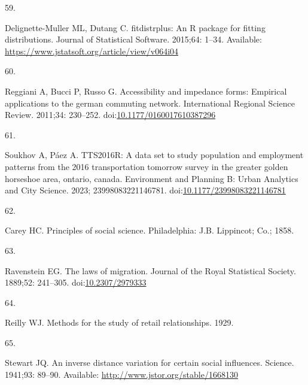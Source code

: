 \documentclass[10pt,letterpaper]{article}
\newlength{\cslhangindent}
\newlength{\csllabelwidth}
\newlength{\cslentryspacingunit} %
\newenvironment{CSLReferences}[2] %
 {%
  \setlength{\parindent}{0pt}
  \ifodd #1
  \let\oldpar\par
  \def\par{\hangindent=\cslhangindent\oldpar}
  \fi
  \setlength{\parskip}{#2\cslentryspacingunit}
 }%
 {}
\newcommand{\CSLLeftMargin}[1]{\parbox[t]{\csllabelwidth}{#1}}
\newcommand{\CSLRightInline}[1]{\parbox[t]{\linewidth - \csllabelwidth}{#1}\break}
\providecommand{\DIFaddbegin}{} %
\providecommand{\DIFaddend}{} %
\providecommand{\DIFdelbegin}{} %
\providecommand{\DIFdelend}{} %
\newcommand{\DIFscaledelfig}{0.5}
\newlength{\DIFdelgraphicswidth} %
\newlength{\DIFdelgraphicsheight} %
\newcommand{\DIFaddincludegraphics}[2][]{{\color{blue}\fbox{\DIFOincludegraphics[#1]{#2}}}} %
\newcommand{\DIFdelincludegraphics}[2][]{%
\sbox{\DIFdelgraphicsbox}{\DIFOincludegraphics[#1]{#2}}%
\settoboxwidth{\DIFdelgraphicswidth}{\DIFdelgraphicsbox} %
\settoboxtotalheight{\DIFdelgraphicsheight}{\DIFdelgraphicsbox} %
\scalebox{\DIFscaledelfig}{%
\parbox[b]{\DIFdelgraphicswidth}{\usebox{\DIFdelgraphicsbox}\\[-\baselineskip] \rule{\DIFdelgraphicswidth}{0em}}\llap{\resizebox{\DIFdelgraphicswidth}{\DIFdelgraphicsheight}{%
\setlength{\unitlength}{\DIFdelgraphicswidth}%
\begin{picture}(1,1)%
\thicklines\linethickness{2pt} %
{\color[rgb]{1,0,0}\put(0,0){\framebox(1,1){}}}%
{\color[rgb]{1,0,0}\put(0,0){\line( 1,1){1}}}%
{\color[rgb]{1,0,0}\put(0,1){\line(1,-1){1}}}%
\end{picture}%
}\hspace*{3pt}}} %
} %
\DeclareRobustCommand{\DIFaddbegin}{\DIFOaddbegin \let\includegraphics\DIFaddincludegraphics} %
\DeclareRobustCommand{\DIFaddend}{\DIFOaddend \let\includegraphics\DIFOincludegraphics} %
\DeclareRobustCommand{\DIFdelbegin}{\DIFOdelbegin \let\includegraphics\DIFdelincludegraphics} %
\DeclareRobustCommand{\DIFdelend}{\DIFOaddend \let\includegraphics\DIFOincludegraphics} %
\begin{document}
\begin{CSLReferences}{0}{0}
\leavevmode{}%
\DIFdelbegin %
\DIFdelend \DIFaddbegin \CSLLeftMargin{59. }\DIFaddend %
\CSLRightInline{Delignette-Muller ML, Dutang C. {fitdistrplus}: An {R}
package for fitting distributions. Journal of Statistical Software.
2015;64: 1--34. Available:
\url{https://www.jstatsoft.org/article/view/v064i04}}

\leavevmode{}%
\DIFdelbegin %
\DIFdelend \DIFaddbegin \CSLLeftMargin{60. }\DIFaddend %
\CSLRightInline{Reggiani A, Bucci P, Russo G. Accessibility and
impedance forms: Empirical applications to the german commuting network.
International Regional Science Review. 2011;34: 230--252.
doi:\href{https://doi.org/10.1177/0160017610387296}{10.1177/0160017610387296}}

\leavevmode{}%
\DIFdelbegin %
\DIFdelend \DIFaddbegin \CSLLeftMargin{61. }\DIFaddend %
\CSLRightInline{Soukhov A, Páez A. {TTS}2016R: A data set to study
population and employment patterns from the 2016 transportation tomorrow
survey in the greater golden horseshoe area, ontario, canada.
Environment and Planning B: Urban Analytics and City Science. 2023;
23998083221146781.
doi:\href{https://doi.org/10.1177/23998083221146781}{10.1177/23998083221146781}}

\leavevmode{}%
\DIFdelbegin %
\DIFdelend \DIFaddbegin \CSLLeftMargin{62. }\DIFaddend %
\CSLRightInline{Carey HC. Principles of social science. Philadelphia:
J.B. Lippincot; Co.; 1858. }

\leavevmode{}%
\DIFdelbegin %
\DIFdelend \DIFaddbegin \CSLLeftMargin{63. }\DIFaddend %
\CSLRightInline{Ravenstein EG. The laws of migration. Journal of the
Royal Statistical Society. 1889;52: 241--305.
doi:\href{https://doi.org/10.2307/2979333}{10.2307/2979333}}

\leavevmode{}%
\DIFdelbegin %
\DIFdelend \DIFaddbegin \CSLLeftMargin{64. }\DIFaddend %
\CSLRightInline{Reilly WJ. Methods for the study of retail
relationships. 1929. }

\leavevmode{}%
\DIFdelbegin %
\DIFdelend \DIFaddbegin \CSLLeftMargin{65. }\DIFaddend %
\CSLRightInline{Stewart JQ. An inverse distance variation for certain
social influences. Science. 1941;93: 89--90. Available:
\url{http://www.jstor.org/stable/1668130}}


\end{CSLReferences}
\end{document}
